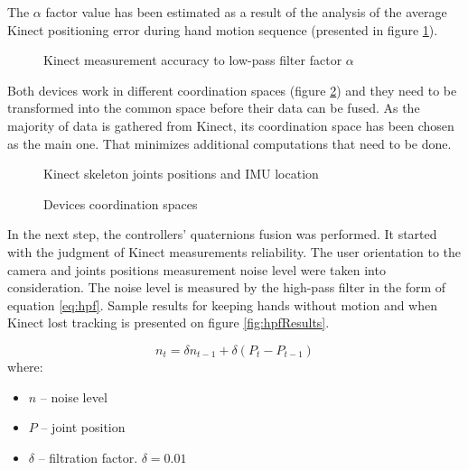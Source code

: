 \documentclass[9pt]{llncs}
\begin{document}
The $\alpha$ factor value has been estimated as a result of the analysis of the average Kinect positioning error during hand motion sequence (presented in figure \ref{fig:lowPass}).

\begin{figure}[!htb]
	\vspace{2.5cm}
	\caption{Kinect measurement accuracy to low-pass filter factor $\alpha$}
	\label{fig:lowPass}
\end{figure}

Both devices work in different coordination spaces (figure \ref{fig:coordinationSpaces}) and they need to be transformed into the common space before their data can be fused. As the majority of data is gathered from Kinect, its coordination space has been chosen as the main one. That minimizes additional computations that need to be done.

\begin{figure}[!htb]
	\centering 
	\begin{minipage}[b]{0.45\linewidth}
		\centering 
		
		\vspace{2.5cm}
		\caption{Kinect skeleton joints positions and IMU location}
		\label{fig:skeleton}
	\end{minipage}
	\begin{minipage}[b]{0.45\linewidth}
		\centering 
		\subfigure[Kinect]
		{
			\vspace{2.5cm}
			\label{fig:kinectCoordinationSpace}
		}
		\subfigure[IMU]
		{
			\vspace{2.5cm}
			\label{fig:imuCoordinationSpace}
		}
		\caption{Devices coordination spaces}
		\label{fig:coordinationSpaces}
	\end{minipage}
\end{figure}

In the next step, the controllers' quaternions fusion was performed. It started with the judgment of Kinect measurements reliability. The user orientation to the camera and joints positions measurement noise level were taken into consideration. The noise level is measured by the high-pass filter in the form of equation \ref{eq:hpf}. Sample results for keeping hands without motion and when Kinect lost tracking is presented on figure \ref{fig:hpfResults}.

\begin{equation}
	\label{eq:hpf}
	n_t = \delta n_{t-1} + \delta(P_t - P_{t-1}) 
\end{equation}\cite{HPFWiki}
where:
\begin{itemize}
	\item $n$ -- noise level
	\item $P$ -- joint position
	\item $\delta$ -- filtration factor. $\delta = 0.01$
\end{itemize}
\end{document}
